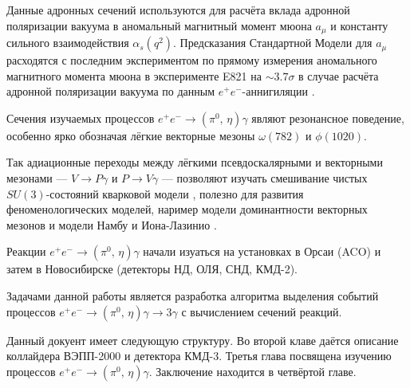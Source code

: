 Данные адронных сечений используются для расчёта вклада адронной поляризации вакуума в аномальный магнитный момент мюона $a_\mu$ и константу сильного взаимодействия $\alpha_s(q^2)$.
Предсказания Стандартной Модели для $a_\mu$ расходятся с последним экспериментом по прямому измерения аномального магнитного момента мюона в эксперименте E821 \cite{Bennett:2006fi} на 
$\sim 3.7 \sigma$ в случае расчёта адронной поляризации вакуума по данным $e^+e^-$-аннигиляции \cite{KNT18}.


Сечения изучаемых процессов
$e^+e^- \to (\pi^0, \, \eta) \gamma$
являют резонансное поведение,
особенно ярко обозначая лёгкие векторные мезоны
$\omega(782)$ и $\phi(1020)$.

Так адиационные переходы между лёгкими псевдоскалярными и векторными мезонами ---
$V \to P \gamma$ и $P \to V \gamma$ ---
позволяют изучать смешивание чистых $SU(3)$-состояний кварковой модели \cite{Feldmann2000},
полезно для развития феноменологических моделей,
наример модели доминантности векторных мезонов \cite{Sakurai:1960ju} и модели Намбу и Иона-Лазинио \cite{Nambu:1961tp}.


Реакции $e^+e^- \to (\pi^0, \, \eta) \gamma$ начали изуаться на установках в Орсаи (ACO)
и затем в Новосибирске (детекторы НД, ОЛЯ, СНД, КМД-2).

Задачами данной работы является разработка алгоритма выделения событий процессов
$e^+e^- \to (\pi^0, \, \eta) \gamma \to 3 \gamma$
с вычислением сечений реакций.

Данный докуент имеет следующую структуру.
Во второй клаве даётся описание коллайдера ВЭПП-2000 и детектора КМД-3.
Третья глава посвящена изучению процессов $e^+e^- \to (\pi^0, \, \eta) \gamma$.
Заключение находится в четвёртой главе.